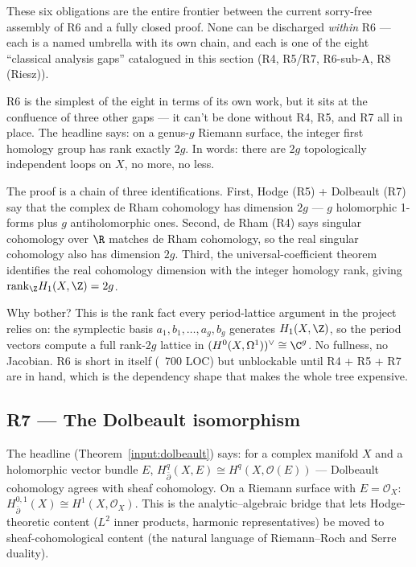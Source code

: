 These six obligations are the entire frontier between the current
sorry-free assembly of R6 and a fully closed proof.  None can be
discharged \emph{within} R6 --- each is a named umbrella with its own
chain, and each is one of the eight ``classical analysis gaps''
catalogued in this section (R4, R5/R7, R6-sub-A, R8 (Riesz)).

\begin{layman}
R6 is the simplest of the eight in terms of its own work, but it
sits at the confluence of three other gaps --- it can't be done
without R4, R5, and R7 all in place.  The headline says: on a genus-\(g\)
Riemann surface, the integer first homology group has rank exactly
\(2g\).  In words: there are \(2g\) topologically independent loops
on \(X\), no more, no less.

The proof is a chain of three identifications.  First, Hodge (R5) +
Dolbeault (R7) say that the complex de Rham cohomology has dimension
\(2g\) --- \(g\) holomorphic 1-forms plus \(g\) antiholomorphic ones.
Second, de Rham (R4) says singular cohomology over \(\R\) matches
de Rham cohomology, so the real singular cohomology also has
dimension \(2g\).  Third, the universal-coefficient theorem
identifies the real cohomology dimension with the integer homology
rank, giving \(\mathrm{rank}_\Z H_1(X, \Z) = 2g\).

Why bother?  This is the rank fact every period-lattice argument in
the project relies on: the symplectic basis \(a_1, b_1, \ldots, a_g,
b_g\) generates \(H_1(X, \Z)\), so the period vectors compute a full
rank-\(2g\) lattice in \((H^0(X, \Omega^1))^\vee \cong \C^g\).  No
fullness, no Jacobian.  R6 is short in itself (~700 LOC) but
unblockable until R4 + R5 + R7 are in hand, which is the dependency
shape that makes the whole tree expensive.
\end{layman}

\subsection{R7 --- The Dolbeault isomorphism}
\label{subsec:gap-R7-dolbeault}

The headline (Theorem~\ref{input:dolbeault}) says: for a complex
manifold \(X\) and a holomorphic vector bundle \(E\),
\(H^q_{\bar\partial}(X, E) \cong H^q(X, \mathcal{O}(E))\) --- Dolbeault
cohomology agrees with sheaf cohomology.  On a Riemann surface with
\(E = \mathcal{O}_X\): \(H^{0,1}_{\bar\partial}(X) \cong H^1(X, \mathcal{O}_X)\).
This is the analytic--algebraic bridge that lets Hodge-theoretic
content (\(L^2\) inner products, harmonic representatives) be moved
to sheaf-cohomological content (the natural language of Riemann--Roch
and Serre duality).

